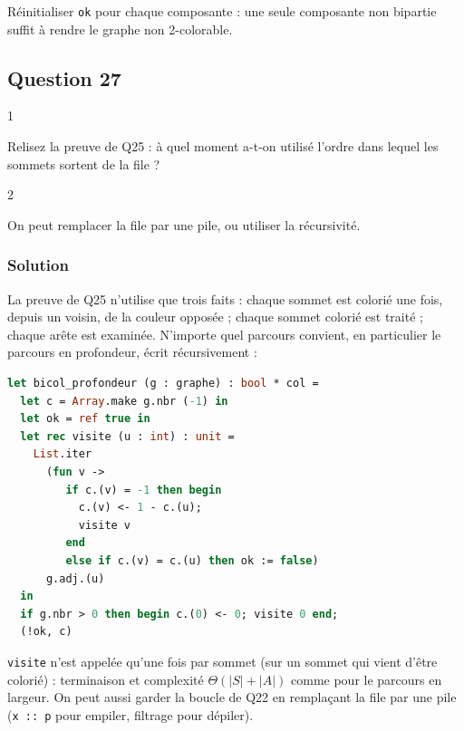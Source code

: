 \documentclass[11pt,a4paper]{article}
\begin{document}
\begin{piege}

Réinitialiser \texttt{ok} pour chaque composante : une seule composante non bipartie suffit à rendre le graphe non 2-colorable.

\end{piege}

\hypertarget{question-27}{%
\subsection{Question 27}\label{question-27}}

\begin{indication}{1}

Relisez la preuve de Q25 : à quel moment a-t-on utilisé l'ordre dans lequel les sommets sortent de la file ?

\end{indication}

\begin{indication}{2}

On peut remplacer la file par une pile, ou utiliser la récursivité.

\end{indication}

\hypertarget{solution-26}{%
\subsubsection{Solution}\label{solution-26}}

La preuve de Q25 n'utilise que trois faits : chaque sommet est colorié une fois, depuis un voisin, de la couleur opposée ; chaque sommet colorié est traité ; chaque arête est examinée. N'importe quel parcours convient, en particulier le parcours en profondeur, écrit récursivement :

\begin{lstlisting}[language=Caml]
let bicol_profondeur (g : graphe) : bool * col =
  let c = Array.make g.nbr (-1) in
  let ok = ref true in
  let rec visite (u : int) : unit =
    List.iter
      (fun v ->
         if c.(v) = -1 then begin
           c.(v) <- 1 - c.(u);
           visite v
         end
         else if c.(v) = c.(u) then ok := false)
      g.adj.(u)
  in
  if g.nbr > 0 then begin c.(0) <- 0; visite 0 end;
  (!ok, c)
\end{lstlisting}

\texttt{visite} n'est appelée qu'une fois par sommet (sur un sommet qui vient d'être colorié) : terminaison et complexité \(\Theta(|S| + |A|)\) comme pour le parcours en largeur. On peut aussi garder la boucle de Q22 en remplaçant la file par une pile (\texttt{x\ ::\ p} pour empiler, filtrage pour dépiler).
\end{document}
